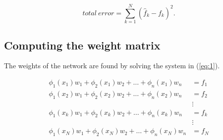 \documentclass[letterpaper, 10 pt, conference]{ieeeconf}  %
\begin{document}
$$
total~error = \sum_{k=1}^N (\hat{f}_k-f_k)^2.
$$

\subsection{Computing the weight matrix}

The weights of the network are found by solving the system in (\ref{eq:1}).

\begin{equation}
\begin{split}
\phi_1(x_1)w_1 + \phi_2(x_1)w_2 + \dots + \phi_n(x_1)w_n &= f_1 \\
\phi_1(x_2)w_1 + \phi_2(x_2)w_2 + \dots + \phi_n(x_2)w_n &= f_2 \\
&\vdots \\
\phi_1(x_k)w_1 + \phi_2(x_k)w_2 + \dots + \phi_n(x_k)w_n &= f_k \\
&\vdots \\
\phi_1(x_N)w_1 + \phi_2(x_N)w_2 + \dots + \phi_n(x_N)w_n &= f_N
\end{split}
\label{eq:1}
\end{equation}
\end{document}
